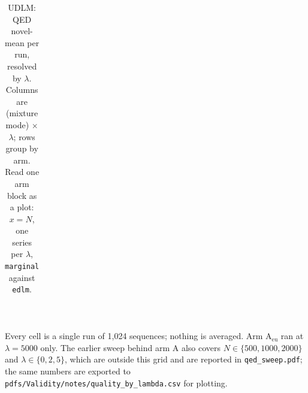 \documentclass[11pt]{article}
\begin{document}
\begin{table}[htbp]
{\begin{tabular}{lrrrrrrrrrrr}
\bottomrule
\end{tabular}}
\\[0.4em] \begin{minipage}{0.92\textwidth}\footnotesize Every cell is a single run of 1{,}024 sequences; nothing is averaged. Arm A$_{\mathrm{eu}}$ ran at $\lambda = 5000$ only. The earlier sweep behind arm A also covers $N \in \{500, 1000, 2000\}$ and $\lambda \in \{0, 2, 5\}$, which are outside this grid and are reported in \texttt{qed\_sweep.pdf}; the same numbers are exported to \texttt{pdfs/Validity/notes/quality\_by\_lambda.csv} for plotting.\end{minipage}
\caption{UDLM: QED novel-mean per run, resolved by $\lambda$. Columns are (mixture mode) $\times$ $\lambda$; rows group by arm. Read one arm block as a plot: $x = N$, one series per $\lambda$, \texttt{marginal} against \texttt{edlm}.}
\label{tab:ov-prop-lambda-UDLM}
\end{table}
\end{document}
